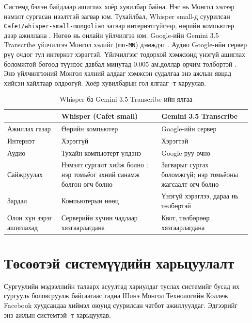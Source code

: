 Системд бэлэн байдлаар ашиглах хоёр хувилбар байна. Нэг нь Монгол хэлээр нэмэлт сургасан нээлттэй загвар юм. Тухайлбал, Whisper small-д суурилсан \texttt{Cafet/\allowbreak whisper-small-\allowbreak mongolian} загвар интернэтгүйгээр, өөрийн компьютер дээр ажиллана \cite{cafet_whisper_small_mn}. Нөгөө нь онлайн үйлчилгээ юм. Google-ийн Gemini 3.5 Transcribe үйлчилгээ Монгол хэлийг (\texttt{mn-MN}) дэмждэг \cite{google_transcribe_model}. Аудио Google-ийн сервер рүү очдог тул интернэт хэрэгтэй. Үйлчилгээг тодорхой хэмжээнд үнэгүй ашиглах боломжтой бөгөөд түүнээс давбал минутад 0.005 ам.доллар орчим төлбөртэй \cite{google_pricing}. Энэ үйлчилгээний Монгол хэлний алдааг хэмжсэн судалгаа энэ ажлын явцад хийсэн хайлтаар олдоогүй. Хоёр хувилбарын гол ялгааг -т харуулав.


\begin{table}[ht]
\centering
\caption{Whisper ба Gemini 3.5 Transcribe-ийн ялгаа}
\label{tab:asr_compare}
\begin{tabular}{|p{3.6cm}|p{5.0cm}|p{5.0cm}|}
\hline
 & \textbf{Whisper (Cafet small)} & \textbf{Gemini 3.5 Transcribe} \\
\hline
Ажиллах газар & Өөрийн компьютер & Google-ийн сервер \\
\hline
Интернэт & Хэрэггүй & Хэрэгтэй \\
\hline
Аудио & Тухайн компьютерт үлдэнэ & Google руу очно \\
\hline
Сайжруулах & Нэмэлт сургалт хийж болно \cite{mengke2025khalkha}; нэр томьёог эхний санамж болгон өгч болно \cite{openai_whisper_repo} & Загварыг сургах боломжгүй; нэр томьёоны жагсаалт өгч болно \cite{google_transcribe_model} \\
\hline
Зардал & Компьютерын нөөц & Үнэгүй хэрэглээ, дараа нь төлбөртэй \\
\hline
Олон хүн зэрэг ашиглахад & Серверийн хүчин чадлаар хязгаарлагдана & Квот, төлбөрөөр хязгаарлагдана \\
\hline
\end{tabular}
\end{table}

\section{Төсөөтэй системүүдийн харьцуулалт}
\label{sec:lit-compare}

Сургуулийн мэдээллийн талаарх асуултад хариулдаг туслах системийг бусад их сургууль боловсруулж байгаагаас гадна Шинэ Монгол Технологийн Коллеж Facebook хуудсандаа хиймэл оюунд суурилсан чатбот ажиллуулдаг. Эдгээрийг энэ ажлын системтэй -т харьцуулав.

